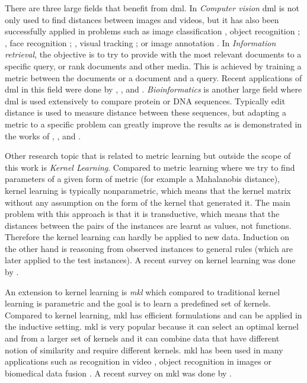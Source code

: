 \documentclass[12pt,a4paper]{report}
\begin{document}
There are three large fields that benefit from \acl{dml}. In \textit{Computer vision} \ac{dml} is not only used to find distances between images and videos, but it has also been successfully applied in problems such as image classification \citep{mensink2012metric}, object recognition \citep{frome2007learning}; \citep{verma2012learning}, face recognition \citep{guillaumin2009you}; \citep{lu2014neighborhood}, visual tracking \citep{li2012non}; \citep{jiang2012order} or image annotation \citep{guillaumin2009tagprop}. In \textit{Information retrieval}, the objective is to try to provide with the most relevant documents to a specific query, or rank documents and other media. This is achieved by training a metric between the documents or a document and a query. Recent applications of \acl{dml} in this field were done by \cite{lebanon2006metric}, \cite{lee2008rank}, \cite{mcfee2010metric} and \cite{lim2013robust}. \textit{Bioinformatics} is another large field where \acl{dml} is used extensively to compare protein or DNA sequences. Typically edit distance is used to measure distance between these sequences, but adapting a metric to a specific problem can greatly improve the results as is demonstrated in the works of \cite{xiong2006kernel}, \cite{saigo2006optimizing}, \cite{kato2010metric} and \cite{wang2012prodis}.

Other research topic that is related to metric learning but outside the scope of this work is \textit{Kernel Learning}. Compared to metric learning where we try to find parameters of a given form of metric (for example a Mahalanobis distance), kernel learning is typically nonparametric, which means that the kernel matrix without any assumption on the form of the kernel that generated it. The main problem with this approach is that it is transductive, which means that the distances between the pairs of the instances are learnt as values, not functions. Therefore the kernel learning can hardly be applied to new data.  Induction on the other hand is reasoning from observed instances to general rules (which are later applied to the test instances). A recent survey on kernel learning was done by \cite{abbasnejad2012survey}.

An extension to kernel learning is \textit{\ac{mkl}} which compared to traditional kernel learning is parametric and the goal is to learn a predefined set of kernels. Compared to kernel learning, \ac{mkl} has efficient formulations and can be applied in the inductive setting. \Ac{mkl} is very popular because it can select an optimal kernel and from a larger set of kernels and it can combine data that have different notion of similarity and require different kernels. \ac{mkl} has been used in many applications such as recognition in video \citep{chen2013event}, object recognition in images \citep{bucak2014multiple} or biomedical data fusion \citep{yu20102}. A recent survey on \ac{mkl} was done by \cite{gonen2011multiple}.
\end{document}
